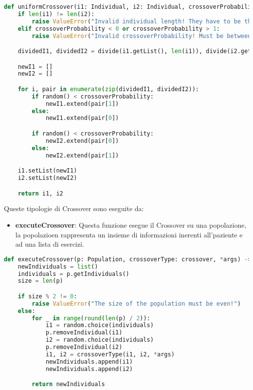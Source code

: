 \documentclass{article}
\begin{document}
\begin{lstlisting}[language=Python, breaklines, no caption]
def uniformCrossover(i1: Individual, i2: Individual, crossoverProbability: float) -> tuple[Individual, Individual]:
    if len(i1) != len(i2):
        raise ValueError("Invalid individual length! They have to be the same.")
    elif crossoverProbability < 0 or crossoverProbability > 1:
        raise ValueError("Invalid crossoverProbability! Must be between 0 and 1")

    dividedI1, dividedI2 = divide(i1.getList(), len(i1)), divide(i2.getList(), len(i2))

    newI1 = []
    newI2 = []

    for i, pair in enumerate(zip(dividedI1, dividedI2)):
        if random() < crossoverProbability:
            newI1.extend(pair[1])
        else:
            newI1.extend(pair[0])

        if random() < crossoverProbability:
            newI2.extend(pair[0])
        else:
            newI2.extend(pair[1])

    i1.setList(newI1)
    i2.setList(newI2)

    return i1, i2
\end{lstlisting}

\pagebreak

Queste tipologie di Crossover sono eseguite da:

\begin{itemize}
\item\textbf{executeCrossover}: Questa funzione esegue il Crossover su una popolazione, la popolazioen rappresenta un insieme di informazioni inerenti all'paziente e ad una lista di esercizi.
\end{itemize}

\begin{lstlisting}[language=Python, breaklines, no caption]
def executeCrossover(p: Population, crossoverType: crossover, *args) -> list[Individual]:
    newIndividuals = list()
    individuals = p.getIndividuals()
    size = len(p)

    if size % 2 != 0:
        raise ValueError("The size of the population must be even!")
    else:
        for _ in range(round(len(p) / 2)):
            i1 = random.choice(individuals)
            p.removeIndividual(i1)
            i2 = random.choice(individuals)
            p.removeIndividual(i2)
            i1, i2 = crossoverType(i1, i2, *args)
            newIndividuals.append(i1)
            newIndividuals.append(i2)

        return newIndividuals
\end{lstlisting}
\end{document}
